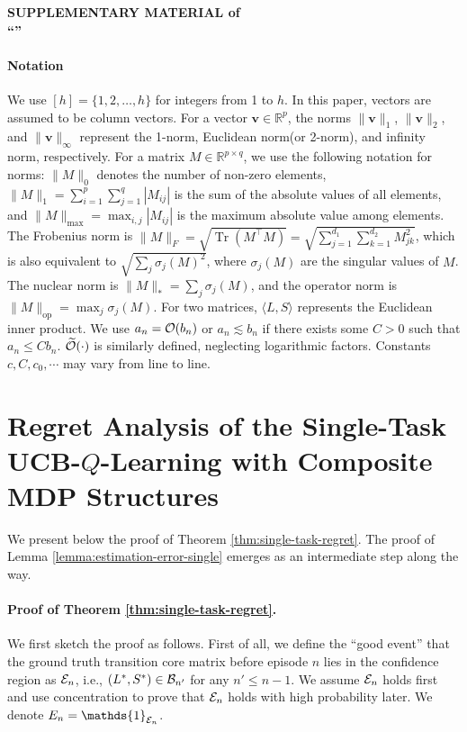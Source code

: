 
{\large\bf SUPPLEMENTARY MATERIAL of \\
	``\TITLE''}

\paragraph{Notation}
We use $[h] = \{1,2,\ldots,h\}$ for integers from 1 to $h$. In this paper, vectors are assumed to be column vectors. For a vector $\mathbf{v} \in \mathbb{R}^p$, the norms $\|\mathbf{v}\|_1$, $\|\mathbf{v}\|_2$, and $\|\mathbf{v}\|_\infty$ represent the 1-norm, Euclidean norm(or 2-norm), and infinity norm, respectively. 
For a matrix $M \in \mathbb{R}^{p \times q}$, we use the following notation for norms: $\|M\|_0$ denotes the number of non-zero elements, $\|M\|_1 = \sum_{i=1}^p \sum_{j=1}^q |M_{ij}|$ is the sum of the absolute values of all elements, and $\|M\|_{\max} = \max_{i,j} |M_{ij}|$ is the maximum absolute value among elements. The Frobenius norm is $\|M\|_F = \sqrt{\operatorname{Tr}(M^{\top} M)} = \sqrt{\sum_{j=1}^{d_1}\sum_{k=1}^{d_2} M_{jk}^2}$, which is also equivalent to $\sqrt{\sum_{j} \sigma_j(M)^2}$, where $\sigma_j(M)$ are the singular values of $M$. The nuclear norm is $\|M\|_* = \sum_{j} \sigma_j(M)$, and the operator norm is $\|M\|_{\text{op}} = \max_j \sigma_j(M)$. For two matrices, $\langle L, S \rangle$ represents the Euclidean inner product.
We use $a_n={\cal O}(b_n)$ or $a_n\lesssim b_n$ if there exists some $C>0$ such that $a_n\le C b_n$. $\widetilde{{\cal O}}(\cdot)$ is similarly defined, neglecting logarithmic factors.
Constants $c,C,c_0,\cdots$ may vary from line to line.

\section{Regret Analysis of the Single-Task UCB-$Q$-Learning with Composite MDP Structures}
We present below the proof of Theorem \ref{thm:single-task-regret}. The proof of Lemma \ref{lemma:estimation-error-single} emerges as an intermediate step along the way.
\paragraph{Proof of Theorem \ref{thm:single-task-regret}.}
We first sketch the proof as follows. 
First of all, we define the ``good event'' that the ground truth transition core matrix before episode $n$ lies in the confidence region as ${\cal E}_n$, i.e., $(  L^*, S^*)\in {\cal B}_{n'}$ for any $n'\le n-1$. We assume ${\cal E}_n$ holds first and use concentration to prove that ${\cal E}_n$ holds with high probability later. We denote $E_n=\mathds{1}_{\calE_n}$.



